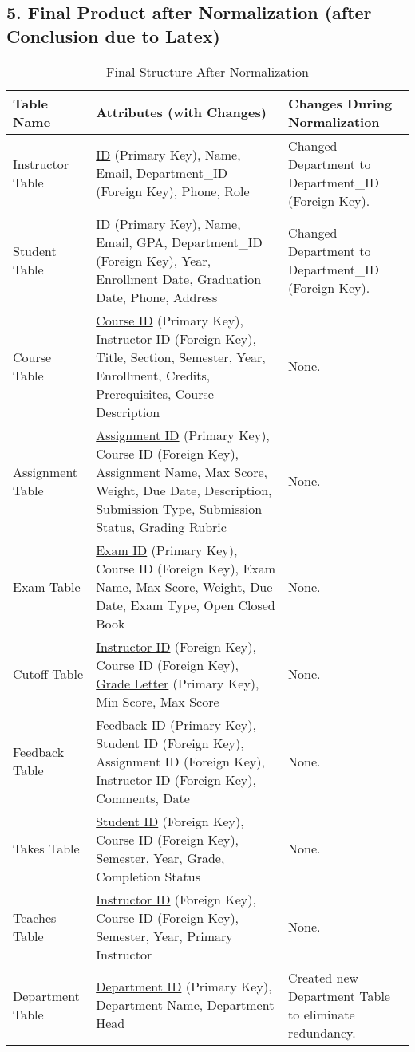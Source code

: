 \documentclass[12pt]{article}
\begin{document}
\subsection*{5. Final Product after Normalization (after Conclusion due to Latex)}
\begin{table}[ht]
    \centering
    \begin{tabularx}{\textwidth}{|X|X|X|}
        \hline
        \textbf{Table Name} & \textbf{Attributes (with Changes)} & \textbf{Changes During Normalization} \\
        \hline
        Instructor Table & \underline{ID} (Primary Key), Name, Email, Department\_ID (Foreign Key), Phone, Role & Changed Department to Department\_ID (Foreign Key). \\
        \hline
        Student Table & \underline{ID} (Primary Key), Name, Email, GPA, Department\_ID (Foreign Key), Year, Enrollment Date, Graduation Date, Phone, Address & Changed Department to Department\_ID (Foreign Key). \\
        \hline
        Course Table & \underline{Course ID} (Primary Key), Instructor ID (Foreign Key), Title, Section, Semester, Year, Enrollment, Credits, Prerequisites, Course Description & None. \\
        \hline
        Assignment Table & \underline{Assignment ID} (Primary Key), Course ID (Foreign Key), Assignment Name, Max Score, Weight, Due Date, Description, Submission Type, Submission Status, Grading Rubric & None. \\
        \hline
        Exam Table & \underline{Exam ID} (Primary Key), Course ID (Foreign Key), Exam Name, Max Score, Weight, Due Date, Exam Type, Open Closed Book & None. \\
        \hline
        Cutoff Table & \underline{Instructor ID} (Foreign Key), Course ID (Foreign Key), \underline{Grade Letter} (Primary Key), Min Score, Max Score & None. \\
        \hline
        Feedback Table & \underline{Feedback ID} (Primary Key), Student ID (Foreign Key), Assignment ID (Foreign Key), Instructor ID (Foreign Key), Comments, Date & None. \\
        \hline
        Takes Table & \underline{Student ID} (Foreign Key), Course ID (Foreign Key), Semester, Year, Grade, Completion Status & None. \\
        \hline
        Teaches Table & \underline{Instructor ID} (Foreign Key), Course ID (Foreign Key), Semester, Year, Primary Instructor & None. \\
        \hline
        Department Table & \underline{Department ID} (Primary Key), Department Name, Department Head & Created new Department Table to eliminate redundancy. \\
        \hline
    \end{tabularx}
    \caption{Final Structure After Normalization}
    \label{tab:final_structure}
\end{table}
\end{document}
